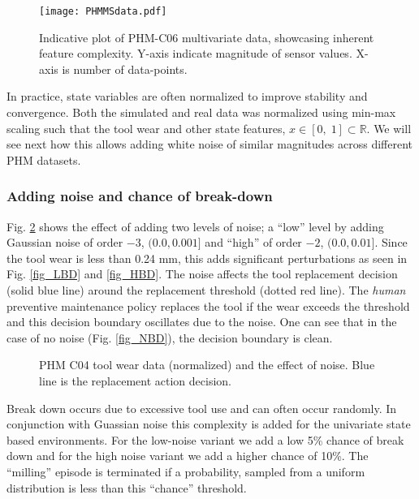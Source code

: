 \documentclass[referee, sn-mathphys-num]{sn-jnl}
\begin{document}
	\begin{figure}[hbt!]
		\centering
		\texttt{[image: PHMMSdata.pdf]}  
		\caption{Indicative plot of PHM-C06 multivariate data, showcasing inherent feature complexity. Y-axis indicate magnitude of sensor values. X-axis is number of data-points.}
		\label{fig_PHMMSdata}
	\end{figure} 
	
	In practice, state variables are often normalized to improve stability and convergence. Both the simulated and real data was normalized using min-max scaling such that the tool wear and other state features, $x \in [0,\;1] \subset \mathbb{R} $. We will see next how this allows adding white noise of similar magnitudes across different PHM datasets.
	
	\subsubsection*{Adding noise and chance of break-down}
	Fig. \ref{fig_noise} shows the effect of adding two levels of noise; a ``low'' level by adding Gaussian noise of order $-3$, $(0.0, 0.001]$ and ``high'' of order $-2$, $(0.0, 0.01]$. Since the tool wear is less than 0.24 mm, this adds significant perturbations as seen in Fig. \ref{fig_LBD} and \ref{fig_HBD}. The noise affects the tool replacement decision (solid blue line) around the replacement threshold (dotted red line). The \textit{human} preventive maintenance policy replaces the tool if the wear exceeds the threshold and this decision boundary oscillates due to the noise. One can see that in the case of no noise (Fig. \ref{fig_NBD}), the decision boundary is clean.
	
	\begin{figure}
		\centering	
		\caption{PHM C04 tool wear data (normalized) and the effect of noise. Blue line is the replacement action decision.}
		\label{fig_noise}
	\end{figure}
	
	Break down occurs due to excessive tool use and can often occur randomly. In conjunction with Guassian noise this complexity is added for the univariate state based environments. For the low-noise variant we add a low 5\% chance of break down and for the high noise variant we add a higher chance of 10\%. The ``milling'' episode is terminated if a probability, sampled from a uniform distribution is less than this ``chance'' threshold.
	
\end{document}
